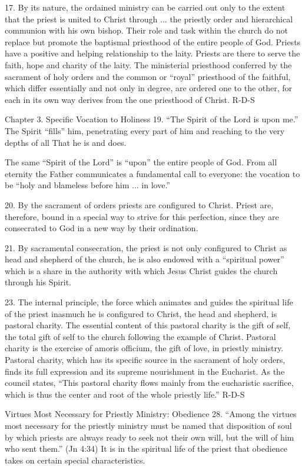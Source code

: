 \documentclass[oneside]{book}
\begin{document}
17. By its nature, the ordained ministry can be carried out only to the extent
that the priest is united to Christ through ... the priestly order and
hierarchical communion with his own bishop. Their role and task within the
church do not replace but promote the baptismal priesthood of the entire people
of God. Priests have a positive and helping relationship to the laity. Priests
are there to serve the faith, hope and charity of the laity. The ministerial
priesthood conferred by the sacrament of holy orders and the common or ``royal''
priesthood of the faithful, which differ essentially and not only in degree, are
ordered one to the other, for each in its own way derives from the one
priesthood of Christ.
R-D-S

Chapter 3. Specific Vocation to Holiness
19. ``The Spirit of the Lord is upon me.'' The Spirit ``fills'' him, penetrating
every part of him and reaching to the very depths of all That he is and does.

The same ``Spirit of the Lord'' is ``upon'' the entire people of God. From all
eternity the Father communicates a fundamental call to everyone: the vocation to
be ``holy and blameless before him ... in love.''

20. By the sacrament of orders priests are configured to Christ. Priest are,
therefore, bound in a special way to strive for this perfection, since they are
consecrated to God in a new way by their ordination.

21. By sacramental consecration, the priest is not only configured to Christ as
head and shepherd of the church, he is also endowed with a ``spiritual power''
which is a share in the authority with which Jesus Christ guides the church
through his Spirit.

23. The internal principle, the force which animates and guides the spiritual
life of the priest inasmuch he is configured to Christ, the head and shepherd,
is pastoral charity. The essential content of this pastoral charity is the gift
of self, the total gift of self to the church following the example of
Christ. Pastoral charity is the exercise of amoris officium, the gift of love,
in priestly ministry. Pastoral charity, which has its specific source in the
sacrament of holy orders, finds its full expression and its supreme nourishment
in the Eucharist. As the council states, ``This pastoral charity flows mainly
from the eucharistic sacrifice, which is thus the center and root of the whole
priestly life.''
R-D-S

Virtues Most Necessary for Priestly Ministry: Obedience
28. ``Among the virtues most necessary for the priestly ministry must be named
that disposition of soul by which priests are always ready to seek not their own
will, but the will of him who sent them.'' (Jn 4:34) It is in the spiritual life
of the priest that obedience takes on certain special characteristics.
\end{document}
